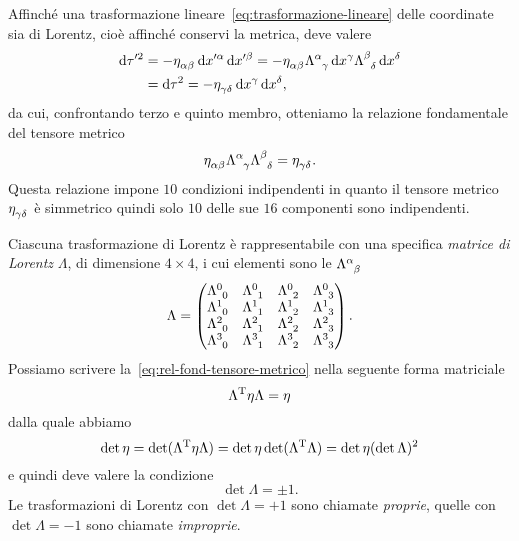 Affinché una trasformazione lineare~\eqref{eq:trasformazione-lineare} delle
coordinate sia di Lorentz, cioè affinché conservi la metrica, deve valere
\begin{equation}
  \begin{split}
    \dd \tau'^{2} &= -\tensor{\eta}{_{\alpha\beta}}\dd x'^{\alpha}\dd x'^{\beta}
    = -\tensor{\eta}{_{\alpha\beta}} \tensor{\Lambda}{^{\alpha}_{\gamma}} \dd
    x^{\gamma} \tensor{\Lambda}{^{\beta}_{\delta}} \dd x^{\delta} \\
    &= \dd \tau^{2} = -\tensor{\eta}{_{\gamma\delta}} \dd x^{\gamma} \dd x^{\delta},
  \end{split}
\end{equation}
da cui, confrontando terzo e quinto membro, otteniamo la relazione fondamentale
del tensore metrico
\begin{equation}
  \label{eq:rel-fond-tensore-metrico}
  \tensor{\eta}{_{\alpha\beta}} \tensor{\Lambda}{^{\alpha}_{\gamma}}
  \tensor{\Lambda}{^{\beta}_{\delta}} = \tensor{\eta}{_{\gamma\delta}}.
\end{equation}
Questa relazione impone $10$ condizioni indipendenti in quanto il tensore
metrico $\tensor{\eta}{_{\gamma\delta}}$ è simmetrico quindi solo $10$ delle sue
$16$ componenti sono indipendenti.

Ciascuna trasformazione di Lorentz è rappresentabile con una specifica
\emph{matrice di Lorentz} $\Lambda$, di dimensione $4 \times 4$, i cui elementi
sono le $\tensor{\Lambda}{^{\alpha}_{\beta}}$
\begin{equation}
  \Lambda =
  \begin{pmatrix}
    \tensor{\Lambda}{^{0}_{0}} & \tensor{\Lambda}{^{0}_{1}} &
    \tensor{\Lambda}{^{0}_{2}} & \tensor{\Lambda}{^{0}_{3}} \\
    \tensor{\Lambda}{^{1}_{0}} & \tensor{\Lambda}{^{1}_{1}} &
    \tensor{\Lambda}{^{1}_{2}} & \tensor{\Lambda}{^{1}_{3}} \\
    \tensor{\Lambda}{^{2}_{0}} & \tensor{\Lambda}{^{2}_{1}} &
    \tensor{\Lambda}{^{2}_{2}} & \tensor{\Lambda}{^{2}_{3}} \\
    \tensor{\Lambda}{^{3}_{0}} & \tensor{\Lambda}{^{3}_{1}} &
    \tensor{\Lambda}{^{3}_{2}} & \tensor{\Lambda}{^{3}_{3}}
  \end{pmatrix}.
\end{equation}
Possiamo scrivere la~\eqref{eq:rel-fond-tensore-metrico} nella seguente forma
matriciale
\begin{equation}
  \Lambda^{\textup{T}}\eta\Lambda = \eta
\end{equation}
dalla quale abbiamo
\begin{equation}
  \det\eta = \det(\Lambda^{\textup{T}}\eta\Lambda) = \det\eta
  \det(\Lambda^{\textup{T}}\Lambda) = \det\eta (\det\Lambda)^{2}
\end{equation}
e quindi deve valere la condizione
\begin{equation}
  \det\Lambda = \pm 1.
\end{equation}
Le trasformazioni di Lorentz con $\det\Lambda = +1$ sono chiamate
\emph{proprie}, quelle con $\det\Lambda = -1$ sono chiamate \emph{improprie}.


